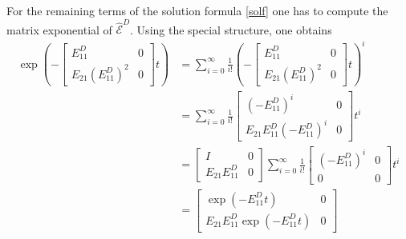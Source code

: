 \documentclass[a4paper,10pt,BCOR=15mm]{scrbook}
\begin{document}
For the remaining terms of the solution formula \eqref{solf} one has to compute the matrix exponential of $\hat{\mathcal E}^D$. Using the special structure, one obtains
\begin{align*}
 \exp \left( -\begin{bmatrix} E_{11}^D & 0 \\ E_{21}(E_{11}^D)^2 & 0 \end{bmatrix}t \right) &= \sum _{i=0} ^\infty \frac{1}{i !}\left( -\begin{bmatrix} E_{11}^D & 0 \\ E_{21}(E_{11}^D)^2 & 0 \end{bmatrix}t \right) ^i\\
&= \sum _{i=0} ^\infty \frac{1}{i !}\begin{bmatrix} (-E_{11}^D)^i & 0 \\ E_{21}E_{11}^D(-E_{11}^D)^i & 0 \end{bmatrix}t ^i \\
&= \begin{bmatrix} I & 0 \\ E_{21}E_{11}^D & 0 \end{bmatrix}\sum _{i=0} ^\infty \frac{1}{i !}\begin{bmatrix} (-E_{11}^D)^i & 0 \\ 0& 0 \end{bmatrix}t ^i \\
&=\begin{bmatrix} \exp(-E_{11}^Dt) & 0 \\ E_{21}E_{11}^D\exp(-E_{11}^Dt) & 0 \end{bmatrix}
\end{align*}
\end{document}
